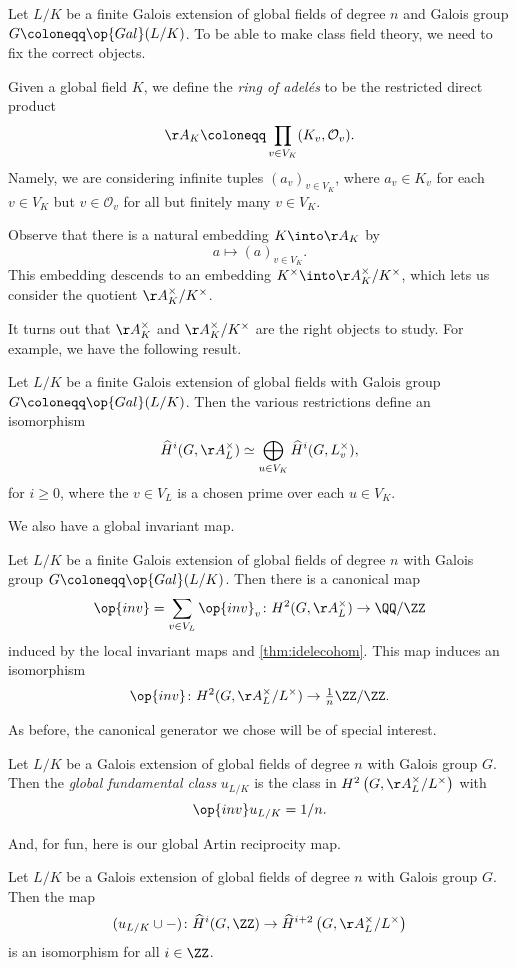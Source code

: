 Let $L/K$ be a finite Galois extension of global fields of degree $n$ and Galois group $G\coloneqq\op{Gal}(L/K)$. To be able to make class field theory, we need to fix the correct objects.
\begin{definition}
	Given a global field $K$, we define the \textit{ring of adel\'es} to be the restricted direct product
	\[\AA_K\coloneqq\prod_{v\in V_K}(K_v,\mathcal O_v).\]
	Namely, we are considering infinite tuples $(a_v)_{v\in V_K}$, where $a_v\in K_v$ for each $v\in V_K$ but $v\in\mathcal O_v$ for all but finitely many $v\in V_K$.
\end{definition}
Observe that there is a natural embedding $K\into\AA_K$ by
\[a\mapsto(a)_{v\in V_K}.\]
This embedding descends to an embedding $K^\times\into\AA_K^\times/K^\times$, which lets us consider the quotient $\AA_K^\times/K^\times$.

It turns out that $\AA_K^\times$ and $\AA_K^\times/K^\times$ are the right objects to study. For example, we have the following result.
\begin{theorem} \label{thm:idelecohom}
	Let $L/K$ be a finite Galois extension of global fields with Galois group $G\coloneqq\op{Gal}(L/K)$. Then the various restrictions define an isomorphism
	\[\widehat H^i(G,\AA_L^\times)\simeq\bigoplus_{u\in V_K}\widehat H^i(G,L_v^\times),\]
	for $i\ge0$, where the $v\in V_L$ is a chosen prime over each $u\in V_K$.
\end{theorem}
We also have a global invariant map.
\begin{theorem}
	Let $L/K$ be a finite Galois extension of global fields of degree $n$ with Galois group $G\coloneqq\op{Gal}(L/K)$. Then there is a canonical map
	\[\op{inv}=\sum_{v\in V_L}\op{inv}_v\colon H^2(G,\AA_L^\times)\to\QQ/\ZZ\]
	induced by the local invariant maps and \autoref{thm:idelecohom}. This map induces an isomorphism
	\[\op{inv}\colon H^2(G,\AA_L^\times/L^\times)\to{\textstyle\frac1n}\ZZ/\ZZ.\]
\end{theorem}
As before, the canonical generator we chose will be of special interest.
\begin{definition}
	Let $L/K$ be a Galois extension of global fields of degree $n$ with Galois group $G$. Then the \textit{global fundamental class} $u_{L/K}$ is the class in $H^2\left(G,\AA_L^\times/L^\times\right)$ with
	\[\op{inv}u_{L/K}=1/n.\]
\end{definition}
And, for fun, here is our global Artin reciprocity map.
\begin{theorem}
	Let $L/K$ be a Galois extension of global fields of degree $n$ with Galois group $G$. Then the map
	\[(u_{L/K}\cup-)\colon\widehat H^i(G,\ZZ)\to\widehat H^{i+2}\left(G,\AA_L^\times/L^\times\right)\]
	is an isomorphism for all $i\in\ZZ$.
\end{theorem}